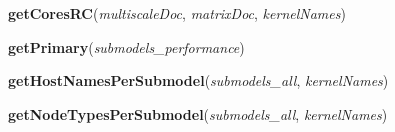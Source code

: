     \label{models:getCoresRC}

    \vspace{0.5ex}

\hspace{.8\funcindent}\begin{boxedminipage}{\funcwidth}

    \raggedright \textbf{getCoresRC}(\textit{multiscaleDoc}, \textit{matrixDoc}, \textit{kernelNames})

\setlength{\parskip}{2ex}
\setlength{\parskip}{1ex}
    \end{boxedminipage}

    \label{models:getPrimary}

    \vspace{0.5ex}

\hspace{.8\funcindent}\begin{boxedminipage}{\funcwidth}

    \raggedright \textbf{getPrimary}(\textit{submodels\_performance})

\setlength{\parskip}{2ex}
\setlength{\parskip}{1ex}
    \end{boxedminipage}

    \label{models:getHostNamesPerSubmodel}

    \vspace{0.5ex}

\hspace{.8\funcindent}\begin{boxedminipage}{\funcwidth}

    \raggedright \textbf{getHostNamesPerSubmodel}(\textit{submodels\_all}, \textit{kernelNames})

\setlength{\parskip}{2ex}
\setlength{\parskip}{1ex}
    \end{boxedminipage}

    \label{models:getNodeTypesPerSubmodel}

    \vspace{0.5ex}

\hspace{.8\funcindent}\begin{boxedminipage}{\funcwidth}

    \raggedright \textbf{getNodeTypesPerSubmodel}(\textit{submodels\_all}, \textit{kernelNames})

\setlength{\parskip}{2ex}
\setlength{\parskip}{1ex}
    \end{boxedminipage}


